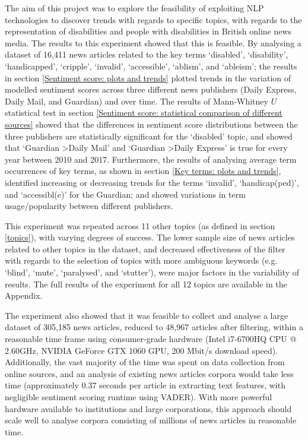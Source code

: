 \documentclass{report}
\begin{document}
The aim of this project was to explore the feasibility of exploiting NLP technologies to discover trends with regards to specific topics, with regards to the representation of disabilities and people with disabilities in British online news media.
The results to this experiment showed that this is feasible.
By analysing a dataset of 16,411 news articles related to the key terms `disabled', `disability', `handicapped', `cripple', `invalid', `accessible', `ablism', and `ableism'; the results in section \ref{Sentiment score: plots and trends} plotted trends in the variation of modelled sentiment scores across three different news publishers (Daily Express, Daily Mail, and Guardian) and over time.
The results of Mann-Whitney $U$ statistical test in section \ref{Sentiment score: statistical comparison of different sources} showed that the differences in sentiment score distributions between the three publishers are statistically significant for the `disabled' topic, and showed that `Guardian \textgreater\space Daily Mail' and `Guardian \textgreater\space Daily Express' is true for every year between 2010 and 2017.
Furthermore, the results of analysing average term occurrences of key terms, as shown in section \ref{Key terms: plots and trends}, identified increasing or decreasing trends for the terms `invalid', `handicap(ped)', and `accessibl(e)' for the Guardian; and showed variations in term usage/popularity between different publishers.

This experiment was repeated across 11 other topics (as defined in section \ref{topics}), with varying degrees of success. 
The lower sample size of news articles related to other topics in the dataset, and decreased effectiveness of the filter with regards to the selection of topics with more ambiguous keywords (e.g. `blind', `mute', `paralysed', and `stutter'), were major factors in the variability of results.
The full results of the experiment for all 12 topics are available in the Appendix.
 
The experiment also showed that it was feasible to collect and analyse a large dataset of 305,185 news articles, reduced to 48,967 articles after filtering, within a reasonable time frame using consumer-grade hardware (Intel i7-6700HQ CPU @ 2.60GHz, NVIDIA GeForce GTX 1060 GPU, 200 Mbit/s download speed).
Additionally, the vast majority of the time was spent on data collection from online sources, and an analysis of existing news articles corpora would take less time (approximately 0.37 seconds per article in extracting text features, with negligible sentiment scoring runtime using VADER).
With more powerful hardware available to institutions and large corporations, this approach should scale well to analyse corpora consisting of millions of news articles in reasonable time.
\end{document}
